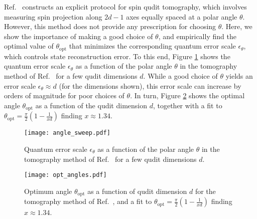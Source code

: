 \documentclass[nofootinbib,twocolumn]{revtex4-1}
\renewcommand{\t}{\text} %
\begin{document}
Ref.~\cite{newton1968measurability} constructs an explicit protocol for spin qudit tomography, which involves measuring spin projection along $2d-1$ axes equally spaced at a polar angle $\theta$.
However, this method does not provide any prescription for choosing $\theta$.
Here, we show the importance of making a good choice of $\theta$, and empirically find the optimal value of $\theta_{\t{opt}}$ that minimizes the corresponding quantum error scale $\epsilon_\theta$, which controls state reconstruction error.
To this end, Figure \ref{fig:angle_sweep} shows the quantum error scale $\epsilon_\theta$ as a function of the polar angle $\theta$ in the tomography method of Ref.~\cite{newton1968measurability} for a few qudit dimensions $d$.
While a good choice of $\theta$ yields an error scale $\epsilon_\theta\approx d$ (for the dimensions shown), this error scale can increase by orders of magnitude for poor choices of $\theta$.
In turn, Figure \ref{fig:opt_angles} shows the optimal angle $\theta_{\t{opt}}$ as a function of the qudit dimension $d$, together with a fit to $\theta_{\t{opt}}=\frac{\pi}{2}(1-\frac1{xd})$ finding $x\approx1.34$.

\begin{figure}
  \centering
  \texttt{[image: angle\_sweep.pdf]}
  \caption{Quantum error scale $\epsilon_\theta$ as a function of the polar angle $\theta$ in the tomography method of Ref.~\cite{newton1968measurability} for a few qudit dimensions $d$.}
  \label{fig:angle_sweep}
\end{figure}

\begin{figure}
  \centering
  \texttt{[image: opt\_angles.pdf]}
  \caption{Optimum angle $\theta_{\t{opt}}$ as a function of qudit dimension $d$ for the tomography method of Ref.~\cite{newton1968measurability}, and a fit to $\theta_{\t{opt}}=\frac{\pi}{2}(1-\frac1{xd})$ finding $x\approx1.34$.}
  \label{fig:opt_angles}
\end{figure}
\end{document}
